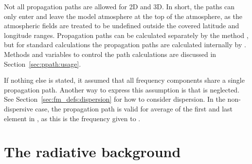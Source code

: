 Not all propagation paths are allowed for 2D and 3D. In short, the paths can
only enter and leave the model atmosphere at the top of the atmosphere, as the
atmospheric fields are treated to be undefined outside the covered latitude and
longitude ranges. Propagation paths can be calculated separately by the method
, but for standard calculations the propagation paths are
calculated internally by . Methods and variables to control
the path calculations are discussed in Section~\ref{sec:ppath:usage}. 

If nothing else is stated, it assumed that all frequency components share a
single propagation path. Another way to express this assumption is that
 is neglected. See Section~\ref{sec:fm_defs:dispersion}
for how to consider dispersion. In the non-dispersive case, the propagation
path is valid for average of the first and last element in ,
as this is the frequency given to .



\section{The radiative background}
\label{sec:fm_defs:rad_bkgr}

